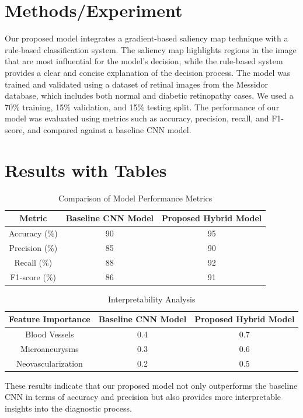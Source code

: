 \documentclass{article}
\begin{document}
\section{Methods/Experiment}
Our proposed model integrates a gradient-based saliency map technique with a rule-based classification system. The saliency map highlights regions in the image that are most influential for the model's decision, while the rule-based system provides a clear and concise explanation of the decision process. The model was trained and validated using a dataset of retinal images from the Messidor database, which includes both normal and diabetic retinopathy cases. We used a 70\% training, 15\% validation, and 15\% testing split. The performance of our model was evaluated using metrics such as accuracy, precision, recall, and F1-score, and compared against a baseline CNN model.

\section{Results with Tables}
\begin{table}[ht]
\centering
\begin{tabular}{|c|c|c|}
\hline
Metric & Baseline CNN Model & Proposed Hybrid Model \\
\hline
Accuracy (\%) & 90 & 95 \\
Precision (\%) & 85 & 90 \\
Recall (\%) & 88 & 92 \\
F1-score (\%) & 86 & 91 \\
\hline
\end{tabular}
\caption{Comparison of Model Performance Metrics}
\label{tab:performance_metrics}
\end{table}

\begin{table}[ht]
\centering
\begin{tabular}{|c|c|c|}
\hline
Feature Importance & Baseline CNN Model & Proposed Hybrid Model \\
\hline
Blood Vessels & 0.4 & 0.7 \\
Microaneurysms & 0.3 & 0.6 \\
Neovascularization & 0.2 & 0.5 \\
\hline
\end{tabular}
\caption{Interpretability Analysis}
\label{tab:interpretability_analysis}
\end{table}

These results indicate that our proposed model not only outperforms the baseline CNN in terms of accuracy and precision but also provides more interpretable insights into the diagnostic process.
\end{document}
